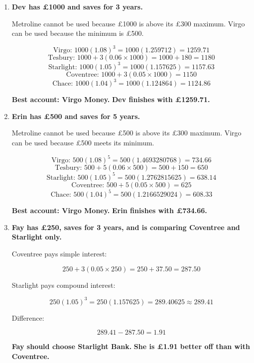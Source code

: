 \documentclass[12pt]{article}
\begin{document}
\begin{enumerate}[label=\textbf{\arabic*.}, leftmargin=4mm, itemsep=6mm, topsep=2mm]
\[
\text{Tesbury: } 400+4(0.06\times 400)=400+96=496
\]
\[
\text{Starlight: } 400(1.05)^4=400(1.21550625)=486.20
\]
\[
\text{Coventree: } 400+4(0.05\times 400)=400+80=480
\]
\[
\text{Chace: } 400(1.04)^4=400(1.16985856)=467.94
\]

\textbf{Best account: Tesbury Bank.}  
\textbf{Chloe finishes with \pounds496.}

\item \textbf{Dev has \pounds1000 and saves for 3 years.}

Metroline cannot be used because \pounds1000 is above its \pounds300 maximum.  
Virgo can be used because the minimum is \pounds500.

\[
\text{Virgo: } 1000(1.08)^3=1000(1.259712)=1259.71
\]
\[
\text{Tesbury: } 1000+3(0.06\times 1000)=1000+180=1180
\]
\[
\text{Starlight: } 1000(1.05)^3=1000(1.157625)=1157.63
\]
\[
\text{Coventree: } 1000+3(0.05\times 1000)=1150
\]
\[
\text{Chace: } 1000(1.04)^3=1000(1.124864)=1124.86
\]

\textbf{Best account: Virgo Money.}  
\textbf{Dev finishes with \pounds1259.71.}

\item \textbf{Erin has \pounds500 and saves for 5 years.}

Metroline cannot be used because \pounds500 is above its \pounds300 maximum.  
Virgo can be used because \pounds500 meets its minimum.

\[
\text{Virgo: } 500(1.08)^5=500(1.4693280768)=734.66
\]
\[
\text{Tesbury: } 500+5(0.06\times 500)=500+150=650
\]
\[
\text{Starlight: } 500(1.05)^5=500(1.2762815625)=638.14
\]
\[
\text{Coventree: } 500+5(0.05\times 500)=625
\]
\[
\text{Chace: } 500(1.04)^5=500(1.2166529024)=608.33
\]

\textbf{Best account: Virgo Money.}  
\textbf{Erin finishes with \pounds734.66.}

\item \textbf{Fay has \pounds250, saves for 3 years, and is comparing Coventree and Starlight only.}

Coventree pays simple interest:

\[
250+3(0.05\times 250)=250+37.50=287.50
\]

Starlight pays compound interest:

\[
250(1.05)^3=250(1.157625)=289.40625\approx 289.41
\]

Difference:

\[
289.41-287.50=1.91
\]

\textbf{Fay should choose Starlight Bank.}  
\textbf{She is \pounds1.91 better off than with Coventree.}

\end{enumerate}
\end{document}
